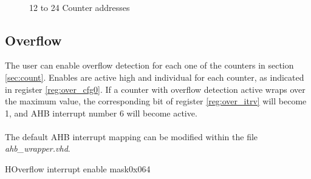\begin{figure}[H]
	\begin{center}
		 \\
		 \\
		 \\
		 \\
		 \\
		 \\
		 \\
		 \\
		 \\
		 \\
		 \\
	\end{center}
	\caption{12 to 24 Counter addresses}\label{fig:counters1}
\end{figure}


\subsection{Overflow}
\label{sec:over}
The user can enable overflow detection for each one of the counters in section \ref{sec:count}. Enables are active high and individual for each counter, as indicated in register \ref{reg:over_cfg0}. If a counter with overflow detection active wraps over the maximum value, the corresponding bit of register \ref{reg:over_itrv} will become 1, and  AHB interrupt number 6 will become active.\\
\\
The default AHB interrupt mapping can be modified within the file \textit{ahb\_wrapper.vhd}.
\begin{register}{H}{Overflow interrupt enable mask}{0x064}
	\begin{tiny}
		\label{reg:over_cfg0}
		\regnewline
	\end{tiny}
\end{register}

